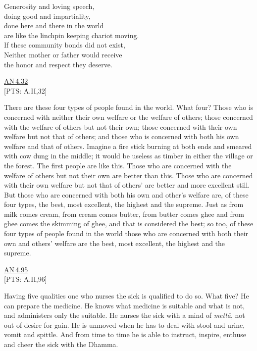 \documentclass[10pt, openright]{book}
\begin{document}
\begin{itemize}


Generosity and loving speech, \\ 
doing good and impartiality, \\ 
done here and there in the world \\ 
are like the linchpin keeping chariot moving. \\ 
If these community bonds did not exist, \\ 
Neither mother or father would receive \\ 
the honor and respect they deserve.


\end{itemize}
\begin{flushright}
\href{https://suttacentral.net/an4.32/en/sujato}{AN 4.32}\\

[PTS: A.II,32]


\end{flushright}
There are these four types of people found in the world. What four? Those who is concerned with neither their own welfare or the welfare of others; those concerned with the welfare of others but not their own; those concerned with their own welfare but not that of others; and those who is concerned with both his own welfare and that of others. Imagine a fire stick burning at both ends and smeared with cow dung in the middle; it would be useless as timber in either the village or the forest. The first people are like this. Those who are concerned with the welfare of others but not their own are better than this. Those who are concerned with their own welfare but not that of others’ are better and more excellent still. But those who are concerned with both his own and other’s welfare are, of these four types, the best, most excellent, the highest and the supreme. Just as from milk comes cream, from cream comes butter, from butter comes ghee and from ghee comes the skimming of ghee, and that is considered the best; so too, of these four types of people found in the world those who are concerned with both their own and others’ welfare are the best, most excellent, the highest and the supreme.


\begin{flushright}
\href{https://suttacentral.net/an4.95/en/sujato}{AN 4.95}\\

[PTS: A.II,96]


\end{flushright}
Having five qualities one who nurses the sick is qualified to do so. What five? He can prepare the medicine. He knows what medicine is suitable and what is not, and administers only the suitable. He nurses the sick with a mind of \textit{mettā}, not out of desire for gain. He is unmoved when he has to deal with stool and urine, vomit and spittle. And from time to time he is able to instruct, inspire, enthuse and cheer the sick with the Dhamma.
\end{document}
